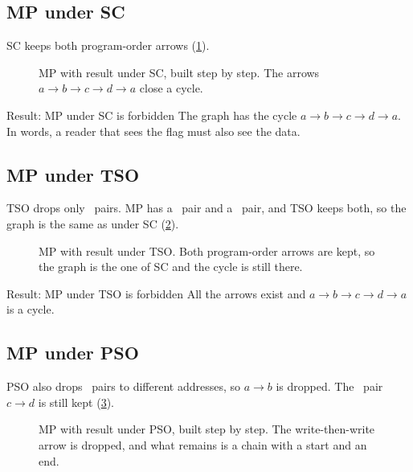 \subsection{MP under SC}
\label{sec:mpsc}

SC keeps both program-order arrows (\cref{fig:mpsc}).

\begin{figure}[H]
\centering
{}
\caption{MP with result  under SC, built step by step. The arrows $a \to b \to c \to d \to a$ close a cycle.}
\label{fig:mpsc}
\end{figure}

\begin{forbidbox}{Result: MP  under SC is forbidden}
The graph has the cycle $a \to b \to c \to d \to a$. In words, a reader that sees the flag must also see the data.
\end{forbidbox}

\subsection{MP under TSO}
\label{sec:mptso}

TSO drops only \WR\ pairs. MP has a \WW\ pair and a \RR\ pair, and TSO keeps both, so the graph is the same as under SC (\cref{fig:mptso}).

\begin{figure}[H]
\centering
{}
\caption{MP with result  under TSO. Both program-order arrows are kept, so the graph is the one of SC and the cycle is still there.}
\label{fig:mptso}
\end{figure}

\begin{forbidbox}{Result: MP  under TSO is forbidden}
All the arrows exist and $a \to b \to c \to d \to a$ is a cycle.
\end{forbidbox}

\subsection{MP under PSO}
\label{sec:mppso}

PSO also drops \WW\ pairs to different addresses, so $a \to b$ is dropped. The \RR\ pair $c \to d$ is still kept (\cref{fig:mppso}).

\begin{figure}[H]
\centering
{}
\caption{MP with result  under PSO, built step by step. The write-then-write arrow is dropped, and what remains is a chain with a start and an end.}
\label{fig:mppso}
\end{figure}

